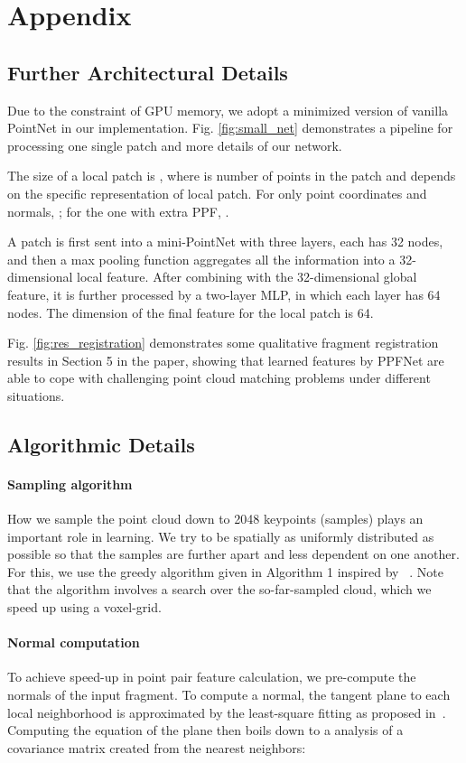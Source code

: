 \documentclass[10pt,twocolumn,letterpaper]{article}
\theoremstyle{break}
\begin{document}
\section{Appendix}
\subsection{Further Architectural Details}
Due to the constraint of GPU memory, we adopt a minimized version of vanilla PointNet in our implementation. Fig. \ref{fig:small_net} demonstrates a pipeline for processing one single patch and more details of our network. 

The size of a local patch is , where  is number of points in the patch and  depends on the specific representation of local patch. For only point coordinates and normals, ; for the one with extra PPF, .

A patch is first sent into a mini-PointNet with three layers, each has 32 nodes, and then a max pooling function aggregates all the information into a 32-dimensional local feature. After combining with the 32-dimensional global feature, it is further processed by a two-layer MLP, in which each layer has 64 nodes. The dimension of the final feature for the local patch is 64.

Fig. \ref{fig:res_registration} demonstrates some qualitative fragment registration results in Section 5 in the paper, showing that learned features by PPFNet are able to cope with challenging point cloud matching  problems under different situations.

\subsection{Algorithmic Details}
\paragraph{Sampling algorithm} 
How we sample the point cloud down to 2048 keypoints (samples) plays an important role in learning. We try to be spatially as uniformly distributed as possible so that the samples are further apart and less dependent on one another. For this, we use the greedy algorithm given in Algorithm 1 inspired by ~\cite{birdal2017sampling}. Note that the algorithm involves a search over the so-far-sampled cloud, which we speed up using a voxel-grid.

\paragraph{Normal computation} 
To achieve speed-up in point pair feature calculation, we pre-compute the normals of the input fragment. To compute a normal, the tangent plane to each local neighborhood is approximated by the least-square fitting as proposed in~\cite{Hoppe1992}. Computing the equation of the plane then boils down to a analysis of a covariance matrix created from the nearest neighbors:
\end{document}
